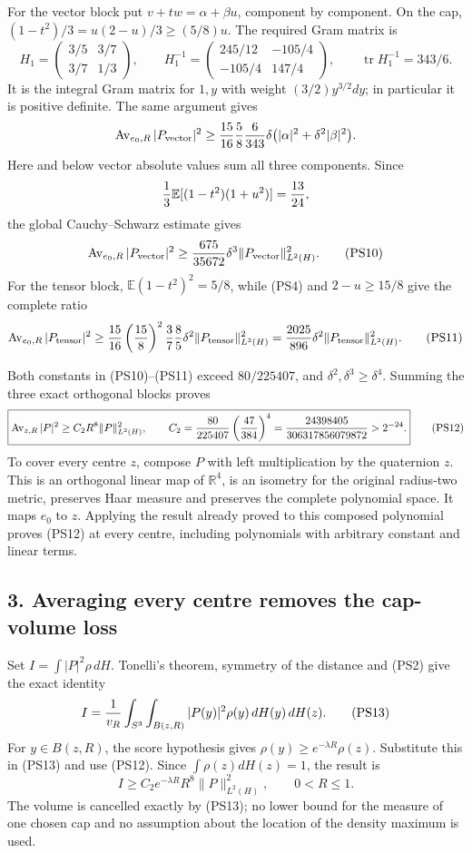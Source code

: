 \documentclass[11pt]{article}
\begin{document}
For the vector block put \(v+tw=\alpha+\beta u\), component by
component. On the cap,
\((1-t^2)/3=u(2-u)/3\ge(5/8)u\). The required Gram matrix is
\[
 H_1=
 \begin{pmatrix}3/5&3/7\\3/7&1/3\end{pmatrix},\qquad
 H_1^{-1}=
 \begin{pmatrix}245/12&-105/4\\-105/4&147/4\end{pmatrix},
 \qquad \operatorname{tr}H_1^{-1}=343/6.
 \tag{PS9}
\]
It is the integral Gram matrix for \(1,y\) with weight
\((3/2)y^{3/2}dy\); in particular it is positive definite.
The same argument gives
\[
 \operatorname{Av}_{e_0,R}|P_{\rm vector}|^2
 \ge {15\over16}{5\over8}{6\over343}
       \delta\bigl(|\alpha|^2+\delta^2|\beta|^2\bigr).
\]
Here and below vector absolute values sum all three components.
Since
\[
 {1\over3}\mathbb E[(1-t^2)(1+u^2)]={13\over24},
\]
the global Cauchy–Schwarz estimate gives
\[
 \operatorname{Av}_{e_0,R}|P_{\rm vector}|^2
 \ge {675\over35672}\delta^3\|P_{\rm vector}\|_{L^2(H)}^2.
 \tag{PS10}
\]
For the tensor block, \(\mathbb E(1-t^2)^2=5/8\), while (PS4)
and \(2-u\ge15/8\) give the complete ratio
\[
 \operatorname{Av}_{e_0,R}|P_{\rm tensor}|^2
 \ge {15\over16}\left({15\over8}\right)^2{3\over7}
       {8\over5}\delta^2\|P_{\rm tensor}\|_{L^2(H)}^2
 ={2025\over896}\delta^2\|P_{\rm tensor}\|_{L^2(H)}^2.
 \tag{PS11}
\]

Both constants in (PS10)–(PS11) exceed \(80/225407\), and
\(\delta^2,\delta^3\ge\delta^4\). Summing the three exact
orthogonal blocks proves
\[
 \boxed{\operatorname{Av}_{z,R}|P|^2
       \ge C_2R^8\|P\|_{L^2(H)}^2,\qquad
 C_2={80\over225407}\left({47\over384}\right)^4
 ={24398405\over306317856079872}>2^{-24}.}
 \tag{PS12}
\]
To cover every centre \(z\), compose \(P\) with left multiplication
by the quaternion \(z\). This is an orthogonal linear map of
\(\mathbb R^4\), is an isometry for the original radius-two metric,
preserves Haar measure and preserves the complete polynomial space.
It maps \(e_0\) to \(z\). Applying the result already proved to this
composed polynomial proves (PS12) at every centre, including
polynomials with arbitrary constant and linear terms.

\subsection*{3. Averaging every centre removes the cap-volume loss}

Set \(I=\int|P|^2\rho\,dH\). Tonelli's theorem, symmetry of the
distance and (PS2) give the exact identity
\[
 I={1\over v_R}\int_{S^3}\int_{B(z,R)}
                        |P(y)|^2\rho(y)\,dH(y)\,dH(z).
 \tag{PS13}
\]
For \(y\in B(z,R)\), the score hypothesis gives
\(\rho(y)\ge e^{-\lambda R}\rho(z)\). Substitute this in (PS13)
and use (PS12). Since \(\int\rho(z)dH(z)=1\), the result is
\[
 I\ge C_2e^{-\lambda R}R^8\|P\|_{L^2(H)}^2,\qquad 0<R\le1.
 \tag{PS14}
\]
The volume is cancelled exactly by (PS13); no lower bound for the
measure of one chosen cap and no assumption about the location of
the density maximum is used.
\end{document}
